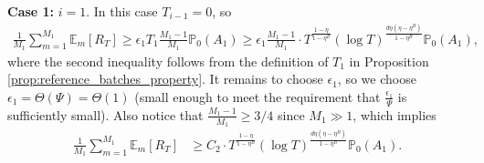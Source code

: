 \documentclass[10pt]{article}
\begin{document}
\textbf{Case 1:} $i=1$. In this case $T_{i-1} = 0$, so
\begin{align}
    \frac{1}{M_1}\sum_{m=1}^{M_1}\mathbb{E}_m[R_T]
    \geq \epsilon_1 T_1 \frac{M_1-1}{M_1} \mathbb{P}_0(A_1)
    \geq \epsilon_1 \frac{M_1-1}{M_1} \cdot T^{\frac{1-\eta}{1-\eta^B}}(\log T)^{\frac{d\eta(\eta- \eta^B)}{1-\eta^B}} \mathbb{P}_0(A_1),
\end{align}
where the second inequality follows from the definition of $T_1$ in Proposition \ref{prop:reference_batches_property}. It remains to choose $\epsilon_1$, so we choose $\epsilon_1=\Theta(\Psi)=\Theta(1)$ (small enough to meet the requirement that $\frac{\epsilon_1}{\Psi}$ is sufficiently small). Also notice that $\frac{M_1-1}{M_1} \geq 3/4$ since $M_1 \gg 1$, which implies
\begin{align}
    \frac{1}{M_1}\sum_{m=1}^{M_1}\mathbb{E}_m[R_T]
    & \geq C_2\cdot T^{\frac{1-\eta}{1-\eta^B}}(\log T)^{\frac{d\eta(\eta- \eta^B)}{1-\eta^B}} \mathbb{P}_0(A_1). \label{eq:first_batch_regret}
\end{align}
\end{document}
